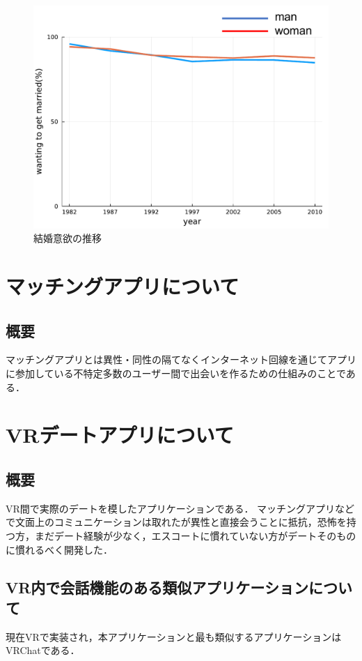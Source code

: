 \documentclass[12pt,a4j,titlepage]{ltjsarticle}
\begin{document}
\begin{figure}[h]
\begin{center}
\includegraphics[keepaspectratio, scale=0.7]{preview.pdf}
\end{center}
 \caption{結婚意欲の推移}
 \label{fig:iyoku}
\end{figure}

\section{マッチングアプリについて}
\subsection{概要}
マッチングアプリとは異性・同性の隔てなくインターネット回線を通じてアプリに参加している不特定多数のユーザー間で出会いを作るための仕組みのことである．


\clearpage

\section{VRデートアプリについて}
\subsection{概要}
VR間で実際のデートを模したアプリケーションである．
マッチングアプリなどで文面上のコミュニケーションは取れたが異性と直接会うことに抵抗，恐怖を持つ方，まだデート経験が少なく，エスコートに慣れていない方がデートそのものに慣れるべく開発した．
\subsection{VR内で会話機能のある類似アプリケーションについて} 
現在VRで実装され，本アプリケーションと最も類似するアプリケーションはVRChatである．
\end{document}
